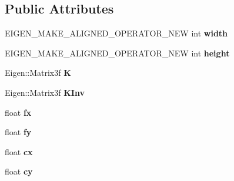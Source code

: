 \subsection*{Public Attributes}
\begin{DoxyCompactItemize}
\item 
\hypertarget{classlsd__slam_1_1_sim3_tracker_a28dd948618997a4dd776d06d44e1bf18}{E\-I\-G\-E\-N\-\_\-\-M\-A\-K\-E\-\_\-\-A\-L\-I\-G\-N\-E\-D\-\_\-\-O\-P\-E\-R\-A\-T\-O\-R\-\_\-\-N\-E\-W int {\bfseries width}}\label{classlsd__slam_1_1_sim3_tracker_a28dd948618997a4dd776d06d44e1bf18}

\item 
\hypertarget{classlsd__slam_1_1_sim3_tracker_a1e0aae58bb3dcbacaa4f5bb465ae0b48}{E\-I\-G\-E\-N\-\_\-\-M\-A\-K\-E\-\_\-\-A\-L\-I\-G\-N\-E\-D\-\_\-\-O\-P\-E\-R\-A\-T\-O\-R\-\_\-\-N\-E\-W int {\bfseries height}}\label{classlsd__slam_1_1_sim3_tracker_a1e0aae58bb3dcbacaa4f5bb465ae0b48}

\item 
\hypertarget{classlsd__slam_1_1_sim3_tracker_a4529e2ed946bff481d2f5ca1ad78c1e7}{Eigen\-::\-Matrix3f {\bfseries K}}\label{classlsd__slam_1_1_sim3_tracker_a4529e2ed946bff481d2f5ca1ad78c1e7}

\item 
\hypertarget{classlsd__slam_1_1_sim3_tracker_a64781f59e228d049e9806f78259941a8}{Eigen\-::\-Matrix3f {\bfseries K\-Inv}}\label{classlsd__slam_1_1_sim3_tracker_a64781f59e228d049e9806f78259941a8}

\item 
\hypertarget{classlsd__slam_1_1_sim3_tracker_a3864ac5e24dda2a906205a21d1ef481d}{float {\bfseries fx}}\label{classlsd__slam_1_1_sim3_tracker_a3864ac5e24dda2a906205a21d1ef481d}

\item 
\hypertarget{classlsd__slam_1_1_sim3_tracker_ac660c0a06c07d7c2eab6f0f739b42c6b}{float {\bfseries fy}}\label{classlsd__slam_1_1_sim3_tracker_ac660c0a06c07d7c2eab6f0f739b42c6b}

\item 
\hypertarget{classlsd__slam_1_1_sim3_tracker_ab6e8cf8f8461e0509f9ad8da938fc9f2}{float {\bfseries cx}}\label{classlsd__slam_1_1_sim3_tracker_ab6e8cf8f8461e0509f9ad8da938fc9f2}

\item 
\hypertarget{classlsd__slam_1_1_sim3_tracker_af9b680e2e537b1596de482551fb078f6}{float {\bfseries cy}}\label{classlsd__slam_1_1_sim3_tracker_af9b680e2e537b1596de482551fb078f6}


\end{DoxyCompactItemize}
